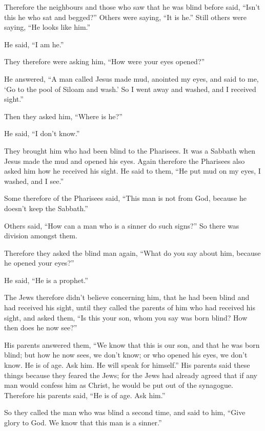  Therefore the neighbours and those who saw that he was
blind before said, ``Isn't this he who sat and begged?'' 
Others were saying, ``It is he.'' Still others were saying, ``He looks
like him.''

He said, ``I am he.''

 They therefore were asking him, ``How were your eyes
opened?''

 He answered, ``A man called Jesus made mud, anointed my
eyes, and said to me, `Go to the pool of Siloam and wash.' So I went
away and washed, and I received sight.''

 Then they asked him, ``Where is he?''

He said, ``I don't know.''

 They brought him who had been blind to the Pharisees.
 It was a Sabbath when Jesus made the mud and opened his
eyes.  Again therefore the Pharisees also asked him how he
received his sight. He said to them, ``He put mud on my eyes, I washed,
and I see.''

 Some therefore of the Pharisees said, ``This man is not
from God, because he doesn't keep the Sabbath.''

Others said, ``How can a man who is a sinner do such signs?'' So there
was division amongst them.

 Therefore they asked the blind man again, ``What do you
say about him, because he opened your eyes?''

He said, ``He is a prophet.''

 The Jews therefore didn't believe concerning him, that he
had been blind and had received his sight, until they called the parents
of him who had received his sight,  and asked them, ``Is
this your son, whom you say was born blind? How then does he now see?''

 His parents answered them, ``We know that this is our son,
and that he was born blind;  but how he now sees, we don't
know; or who opened his eyes, we don't know. He is of age. Ask him. He
will speak for himself.''  His parents said these things
because they feared the Jews; for the Jews had already agreed that if
any man would confess him as Christ, he would be put out of the
synagogue.  Therefore his parents said, ``He is of age. Ask
him.''

 So they called the man who was blind a second time, and
said to him, ``Give glory to God. We know that this man is a sinner.''

